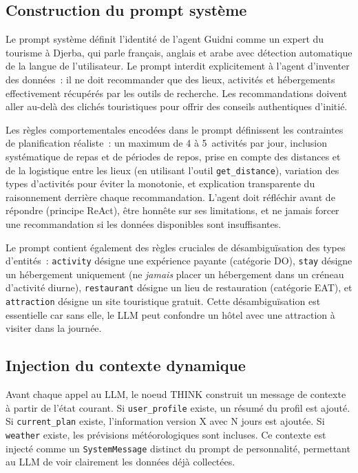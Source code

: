 \subsection{Construction du prompt système}

Le prompt système définit l'identité de l'agent
Guidni comme un expert du tourisme à Djerba, qui parle français, anglais
et arabe avec détection automatique de la langue de l'utilisateur. Le prompt interdit
explicitement à l'agent d'inventer des données~: il ne doit recommander que des lieux, activités
et hébergements effectivement récupérés par les outils de recherche. Les recommandations doivent
aller au-delà des clichés touristiques pour offrir des conseils authentiques d'initié.

Les règles comportementales encodées dans le prompt définissent les contraintes de planification
réaliste~: un maximum de 4 à 5~activités par jour, inclusion systématique de repas et de
périodes de repos, prise en compte des distances et de la logistique entre les lieux
(en utilisant l'outil \texttt{get\_distance}), variation des types d'activités pour éviter la
monotonie, et explication transparente du raisonnement derrière chaque recommandation. L'agent
doit réfléchir avant de répondre (principe ReAct), être honnête sur ses limitations, et
ne jamais forcer une recommandation si les données disponibles sont insuffisantes.

Le prompt contient également des règles cruciales de désambiguïsation des types d'entités~:
\texttt{activity} désigne une expérience payante (catégorie \og{}DO\fg{}), \texttt{stay} désigne
un hébergement uniquement (ne \emph{jamais} placer un hébergement dans un créneau d'activité
diurne), \texttt{restaurant} désigne un lieu de restauration (catégorie
\og{}EAT\fg{}), et \texttt{attraction} désigne un site touristique gratuit. Cette
désambiguïsation est essentielle car sans elle, le LLM peut confondre un hôtel avec une
attraction à visiter dans la journée.


\subsection{Injection du contexte dynamique}

Avant chaque appel au LLM, le noeud THINK construit un message de contexte à partir de l'état
courant. Si \texttt{user\_profile} existe, un résumé du profil est ajouté. Si
\texttt{current\_plan} existe, l'information \og{}version X avec N jours\fg{} est ajoutée. Si
\texttt{weather} existe, les prévisions météorologiques sont incluses. Ce contexte est injecté 
comme un \texttt{SystemMessage} distinct du prompt de
personnalité, permettant au LLM de voir clairement les données déjà collectées.

